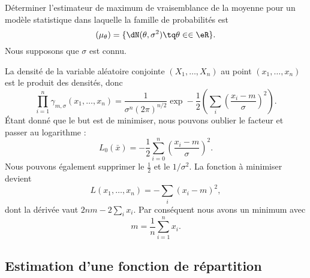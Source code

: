 \begin{example}

	Déterminer l'estimateur de maximum de vraisemblance de la moyenne pour un modèle statistique dans laquelle la famille de probabilités est
	\begin{equation}
		(\mu_{\theta})=\{ \dN(\theta,\sigma^2)\tq \theta\in\in\eR \}.
	\end{equation}
	Nous supposons que \( \sigma\) est connu.

	La densité de la variable aléatoire conjointe \( (X_1,\ldots,X_n)\) au point \( (x_1,\ldots,x_n)\) est le produit des densités, donc
	\begin{equation}
		\prod_{i=1}^n\gamma_{m,\sigma}(x_1,\ldots,x_n)=\frac{1}{ \sigma^n(2\pi)^{n/2} }\exp-\frac{ 1 }{2}\left( \sum_i\left( \frac{ x_i-m }{ \sigma } \right)^2 \right).
	\end{equation}
	Étant donné que le but est de minimiser, nous pouvons oublier le facteur et passer au logarithme :
	\begin{equation}
		L_0(\bar x)=-\frac{ 1 }{2}\sum_{i=0}^n\left( \frac{ x_i-m }{ \sigma } \right)^2.
	\end{equation}
	Nous pouvons également supprimer le \( \frac{ 1 }{2}\) et le \( 1/\sigma^2\). La fonction à minimiser devient
	\begin{equation}
		L(x_1,\ldots,x_n)=-\sum_i(x_i-m)^2,
	\end{equation}
	dont la dérivée vaut \( 2nm-2\sum_ix_i\). Par conséquent nous avons un minimum avec
	\begin{equation}
		m=\frac{1}{ n }\sum_{i=1}^nx_i.
	\end{equation}
\end{example}

\subsection{Estimation d'une fonction de répartition}

